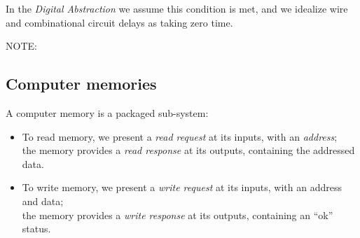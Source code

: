 
In the \emph{Digital Abstraction} we assume this condition is met, and
we idealize wire and combinational circuit delays as taking zero time.


\vspace{1ex}

NOTE: 

\vspace{1ex}



\subsection{Computer memories}

\label{Sec_mem_split_phase}


A computer memory is a packaged sub-system:
\begin{itemize}

 \item To read memory, we present a \emph{read request} at its inputs,
       with an \emph{address}; \\
       the memory provides a \emph{read response} at its outputs,
       containing the addressed data.

 \item To write memory, we present a \emph{write request} at its
       inputs, with an address and data; \\
       the memory provides a \emph{write response} at its outputs,
       containing an ``ok'' status.

\end{itemize}


